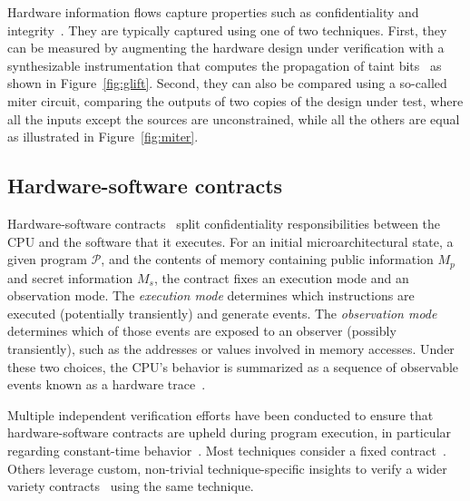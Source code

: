 Hardware information flows capture properties such as confidentiality and integrity~\cite{hu2021hardware}.
They are typically captured using one of two techniques.
First, they can be measured by augmenting the hardware design under verification with a synthesizable instrumentation that computes the propagation of taint bits~\cite{tiwari2009complete,ardeshiricham2017register,solt2022cellift,solt2024hybridift,ceesay2024mucfi} as shown in Figure~\ref{fig:glift}.
Second, they can also be compared using a so-called miter circuit, comparing the outputs of two copies of the design under test, where all the inputs except the sources are unconstrained, while all the others are equal as illustrated in Figure~\ref{fig:miter}.



\subsection{Hardware-software contracts}
\label{subsec:hw-sw-contracts}


Hardware-software contracts~\cite{guarnieri2021hardware} split confidentiality responsibilities between the CPU and the software that it executes.
For an initial microarchitectural state, a given program $\mathcal{P}$, and the contents of memory containing public information $M_p$ and secret information $M_s$, the contract fixes an execution mode and an observation mode.
The \emph{execution mode} determines which instructions are executed (potentially transiently) and generate events.
The \emph{observation mode} determines which of those events are exposed to an observer (possibly transiently), such as the addresses or values involved in memory accesses. Under these two choices, the CPU's behavior is summarized as a sequence of observable events known as a hardware trace~\cite{guarnieri2021hardware,oleksenko2022revizor}.



Multiple independent verification efforts have been conducted to ensure that hardware-software contracts are upheld during program execution, in particular regarding constant-time behavior~\cite{dinesh2024conjunct,ceesay2024mucfi,guarnieri2021hardware,tan2025contractshadowlogic,dinesh2025h,hsiao2024rtl2mmupath,wang2023specification}.
Most techniques consider a fixed contract~\cite{dinesh2024conjunct,ceesay2024mucfi,tan2025contractshadowlogic,dinesh2025h}.
Others leverage custom, non-trivial technique-specific insights to verify a wider variety contracts~\cite{hsiao2024rtl2mmupath,wang2023specification} using the same technique.

